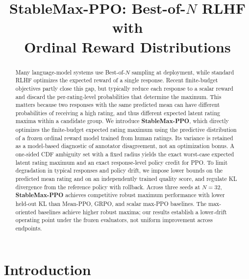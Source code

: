 \documentclass{article}
\title{StableMax-PPO: Best-of-\(N\) RLHF with\protect\\Ordinal Reward Distributions}
\author{}
\date{}
\newcommand{\method}{StableMax-PPO}
\theoremstyle{definition}
\theoremstyle{remark}
\begin{document}
\maketitle

\begin{abstract}
Many language-model systems use Best-of-\(N\) sampling at deployment,
while standard RLHF optimizes the expected reward of a single response.
Recent finite-budget objectives partly close this gap, but typically
reduce each response to a scalar reward and discard the per-rating-level
probabilities that determine the maximum. This matters because two responses with the same predicted mean
can have different probabilities of receiving a high rating, and thus
different expected latent rating maxima within a candidate group. We introduce \textbf{\method{}}, which directly optimizes the finite-budget
expected rating maximum using the predictive distribution of a frozen ordinal reward model
trained from human ratings. Its variance is retained as a model-based diagnostic of annotator disagreement,
not an optimization bonus. A one-sided CDF ambiguity set with a fixed
radius yields the exact worst-case expected latent rating maximum and an exact
response-level policy credit for PPO. To limit degradation in typical responses and policy drift, we impose lower
bounds on the predicted mean rating and on an independently trained quality
score, and regulate KL divergence from the reference policy with rollback. Across three seeds at
\(N=32\), \textbf{\method{}} achieves competitive robust maximum
performance with lower held-out KL than Mean-PPO, GRPO, and scalar
max-PPO baselines. The max-oriented baselines achieve higher robust maxima;
our results establish a lower-drift operating point under the frozen evaluators,
not uniform improvement across endpoints.
\end{abstract}
\section{Introduction}
\label{sec:introduction}
\end{document}
